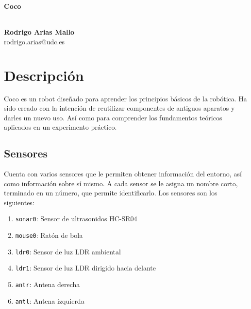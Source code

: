 \documentclass[10pt,a4paper,hidelinks,twocolumn,nobalancelastpage]{article}
\begin{document}
\begin{center}
\begin{huge}
\textbf{Coco}
\end{huge}
\\[10pt]
\textbf{Rodrigo Arias Mallo}\\
rodrigo.arias@udc.es
\end{center}

\newcommand\RobotAngle{45}
\newcommand\RobotSize{2}
\newcommand\RobotRadius{5}
\newcommand\RobotThetaSonar{60.0}

\section{Descripción}
Coco es un robot diseñado para aprender los principios básicos de la robótica.
Ha sido creado con la intención de reutilizar componentes de antiguos aparatos y 
darles un nuevo uso. Así como para comprender los fundamentos teóricos
aplicados en un experimento práctico.

\subsection{Sensores}
Cuenta con varios sensores que le permiten obtener información del entorno, así
como información sobre sí mismo. A cada sensor se le asigna un nombre corto, 
terminado en un número, que permite identificarlo. Los sensores son los 
siguientes:

\begin{enumerate}
	\setlength{\parskip}{0cm}

	\item \texttt{sonar0}: Sensor de ultrasonidos HC-SR04
	\item \texttt{mouse0}: Ratón de bola
	\item \texttt{ldr0}: Sensor de luz LDR ambiental
	\item \texttt{ldr1}: Sensor de luz LDR dirigido hacia delante
	\item \texttt{antr}: Antena derecha
	\item \texttt{antl}: Antena izquierda
\end{enumerate}
\end{document}
